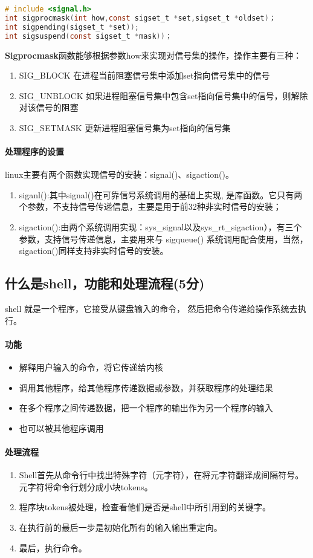 \begin{lstlisting}[language = c]
# include <signal.h>
int sigprocmask(int how,const sigset_t *set,sigset_t *oldset)；
int sigpending(sigset_t *set));
int sigsuspend(const sigset_t *mask))；
\end{lstlisting}

\textbf{Sigprocmask}函数能够根据参数how来实现对信号集的操作，操作主要有三种：

\begin{enumerate}
    \item SIG\_BLOCK	在进程当前阻塞信号集中添加set指向信号集中的信号
    \item SIG\_UNBLOCK	如果进程阻塞信号集中包含set指向信号集中的信号，则解除对该信号的阻塞
    \item SIG\_SETMASK	更新进程阻塞信号集为set指向的信号集
\end{enumerate}

\paragraph{处理程序的设置}linux主要有两个函数实现信号的安装：signal()、sigaction()。
\begin{enumerate}
\item siganl():其中signal()在可靠信号系统调用的基础上实现, 是库函数。它只有两个参数，不支持信号传递信息，主要是用于前32种非实时信号的安装；
\item sigaction():由两个系统调用实现：sys\_signal以及sys\_rt\_sigaction），有三个参数，支持信号传递信息，主要用来与 sigqueue() 系统调用配合使用，当然，sigaction()同样支持非实时信号的安装。
\end{enumerate}

\subsection{什么是shell，功能和处理流程(5分)}
shell 就是一个程序，它接受从键盘输入的命令， 然后把命令传递给操作系统去执行。
\paragraph{功能}
\begin{itemize}
    \item 解释用户输入的命令，将它传递给内核
    \item 调用其他程序，给其他程序传递数据或参数，并获取程序的处理结果
    \item 在多个程序之间传递数据，把一个程序的输出作为另一个程序的输入
    \item 也可以被其他程序调用
\end{itemize}

\paragraph{处理流程}
\begin{enumerate}
    \item Shell首先从命令行中找出特殊字符（元字符），在将元字符翻译成间隔符号。元字符将命令行划分成小块tokens。
    \item 程序块tokens被处理，检查看他们是否是shell中所引用到的关键字。 
    \item 在执行前的最后一步是初始化所有的输入输出重定向。 
    \item 最后，执行命令。 
\end{enumerate}
